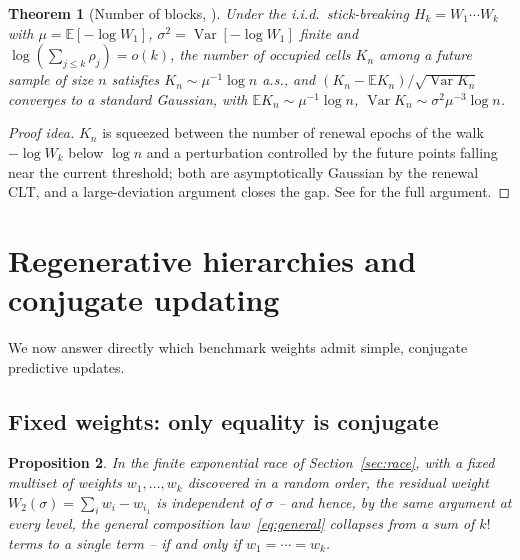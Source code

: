 \documentclass[11pt]{article}
\newcommand{\EE}{\mathbb{E}}
\theoremstyle{plain}
\newtheorem{theorem}{Theorem}[section]
\newtheorem{proposition}[theorem]{Proposition}
\theoremstyle{definition}
\begin{document}
\begin{theorem}[Number of blocks, {\cite[Prop.~8]{GnedinConstrained2006}}]
Under the i.i.d.\ stick-breaking \(H_k=W_1\cdots W_k\) with \(\mu=\EE[-\log W_1]\), \(\sigma^2=\operatorname{Var}[-\log W_1]\) finite and \(\log(\sum_{j\le k}\rho_j)=o(k)\), the number of occupied cells \(K_n\) among a future sample of size \(n\) satisfies \(K_n\sim\mu^{-1}\log n\) a.s., and \((K_n-\EE K_n)/\sqrt{\operatorname{Var}K_n}\) converges to a standard Gaussian, with \(\EE K_n\sim\mu^{-1}\log n\), \(\operatorname{Var}K_n\sim\sigma^2\mu^{-3}\log n\).
\end{theorem}

\begin{proof}[Proof idea]
\(K_n\) is squeezed between the number of renewal epochs of the walk \(-\log W_k\) below \(\log n\) and a perturbation controlled by the future points falling near the current threshold; both are asymptotically Gaussian by the renewal CLT, and a large-deviation argument closes the gap. See \cite{GnedinConstrained2006} for the full argument.
\end{proof}

\section{Regenerative hierarchies and conjugate updating}
\label{sec:regenerative}

We now answer directly which benchmark weights admit simple, conjugate predictive updates.

\subsection{Fixed weights: only equality is conjugate}

\begin{proposition}
\label{prop:only-equal}
In the finite exponential race of Section~\ref{sec:race}, with a fixed multiset of weights \(w_1,\ldots,w_k\) discovered in a random order, the residual weight \(W_2(\sigma)=\sum_iw_i-w_{i_1}\) is independent of \(\sigma\) -- and hence, by the same argument at every level, the general composition law~\eqref{eq:general} collapses from a sum of \(k!\) terms to a single term -- if and only if \(w_1=\cdots=w_k\).
\end{proposition}
\end{document}
